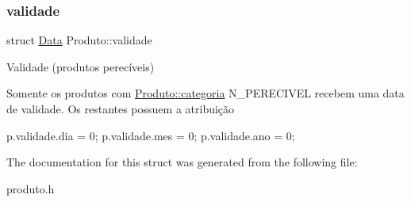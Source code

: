 \subsubsection{\texorpdfstring{validade}{validade}}
{\footnotesize\ttfamily struct \hyperlink{structData}{Data} Produto\+::validade}



Validade (produtos perecíveis) 

Somente os produtos com \hyperlink{structProduto_a790d0998d9d717ef53640efea920b427}{Produto\+::categoria} N\+\_\+\+P\+E\+R\+E\+C\+I\+V\+EL recebem uma data de validade. Os restantes possuem a atribuição 
\begin{DoxyCode}
p.validade.dia = 0;
p.validade.mes = 0;
p.validade.ano = 0;
\end{DoxyCode}
 

The documentation for this struct was generated from the following file\+:\begin{DoxyCompactItemize}
\item 
produto.\+h\end{DoxyCompactItemize}
